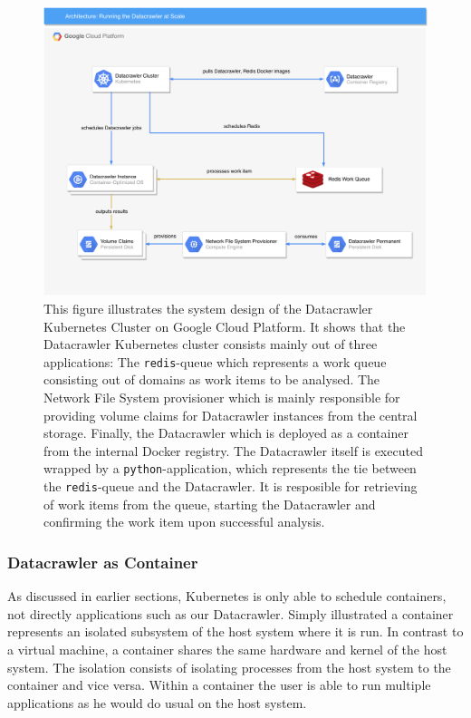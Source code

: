 \begin{figure}
	\centering
	\includegraphics[scale=0.5]{resources/datacrawler_k8s_architecture}
	\caption{This figure illustrates the system design of the Datacrawler Kubernetes Cluster on Google Cloud Platform. It shows that the Datacrawler Kubernetes cluster consists mainly out of three applications: The \texttt{redis}-queue which represents a work queue consisting out of domains as work items to be analysed. The Network File System provisioner which is mainly responsible for providing volume claims for Datacrawler instances from the central storage. Finally, the Datacrawler which is deployed as a container from the internal Docker registry. The Datacrawler itself is executed wrapped by a \texttt{python}-application, which represents the tie between the \texttt{redis}-queue and the Datacrawler. It is resposible for retrieving of work items from the queue, starting the Datacrawler and confirming the work item upon successful analysis.}
	\label{datacrawler_k8s_architecture}
\end{figure}
\subsubsection{Datacrawler as Container}
\label{datacrawler_container}

As discussed in earlier sections, Kubernetes is only able to schedule containers, not directly applications such as our Datacrawler. Simply illustrated a container represents an isolated subsystem of the host system where it is run. In contrast to a virtual machine, a container shares the same hardware and kernel of the host system. The isolation consists of isolating processes from the host system to the container and vice versa. Within a container the user is able to run multiple applications as he would do usual on the host system. 

